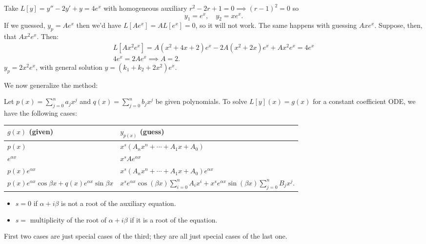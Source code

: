 \begin{example}[Exponential]
    Take $L[y] = y''-2y'+y=4e^x$ with homogeneous auxiliary $r^2 - 2r + 1 = 0 \implies (r-1)^2 = 0$ so $$
    y_1 = e^x, \quad y_2 = xe^x.
    $$
    If we guessed, $y_p = Ae^x$ then we'd have $L[Ae^x] = A L[e^x] = 0$, so it will not work. The same happens with guessing $Axe^x$. Suppose, then, that $Ax^2 e^x$. Then:
    \begin{align*}
        L[Ax^2e^x] = A(x^2 + 4x + 2)e^x - 2A(x^2 + 2x)e^x + Ax^2e^x = 4e^x\\
        4e^x = 2Ae^x \implies A = 2.
    \end{align*}
    $y_p = 2x^2 e^x$, with general solution $y = (k_1 + k_2 + 2x^2)e^x$.
\end{example}

We now generalize the method:

Let $p(x) = \sum_{j=0}^n a_j x^j$ and $q(x) = \sum_{j=0}^n b_j x^j$ be given polynomials. To solve $L[y](x) = g(x)$ for a constant coefficient ODE, we have the following cases:

\begin{table}[!ht]\centering
\begin{tabularx}{\textwidth}{>{\centering\arraybackslash}X | >{\centering\arraybackslash}X }\centering

    $g(x)$ (given) & $y_{p(x)}$ (guess)\\
    \hline
    $p(x)$ &$x^s (A_n x^n + \cdots + A_1 x + A_0)$\\
    $e^{\alpha x} $&  $x^s Ae^{\alpha x}$\\
    $p(x)e^{\alpha x}$ & $x^s (A_n x^n + \cdots + A_1 x + A_0)e^{\alpha x}$\\
    $p(x)e^{\alpha x} \cos \beta x + q(x)e^{\alpha x} \sin \beta x$ &  $x^s e^{\alpha x} \cos (\beta x) \sum_{i=0}^n A_i x^i  + x^s e^{\alpha x} \sin (\beta x) \sum_{j=0}^n B_j x^j$.
\end{tabularx}
\end{table}

\begin{itemize}
    \item $s = 0$ if $\alpha + i \beta$ is not a root of the auxiliary equation.
    \item $s = $ multiplicity of the root of $\alpha + i \beta$ if it is a root of the equation.
\end{itemize}
\begin{remark}
    First two cases are just special cases of the third; they are all just special cases of the last one.
\end{remark}